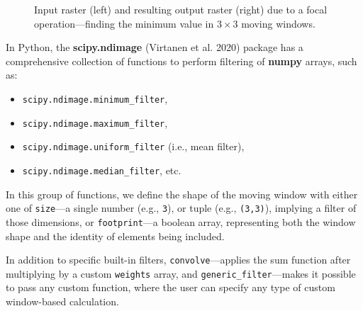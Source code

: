 \documentclass[
  letterpaper,
]{krantz}
\providecommand{\tightlist}{%
  \setlength{\itemsep}{0pt}\setlength{\parskip}{0pt}}\usepackage{longtable,booktabs,array}
\begin{document}
\begin{figure}


\caption{\label{fig-focal-filter}Input raster (left) and resulting
output raster (right) due to a focal operation---finding the minimum
value in \(3 \times 3\) moving windows.}

\end{figure}%

In Python, the \textbf{scipy.ndimage} (Virtanen et al. 2020) package has
a comprehensive collection of functions to perform filtering of
\textbf{numpy} arrays, such as:

\begin{itemize}
\tightlist
\item
  \texttt{scipy.ndimage.minimum\_filter},
\item
  \texttt{scipy.ndimage.maximum\_filter},
\item
  \texttt{scipy.ndimage.uniform\_filter} (i.e., mean filter),
\item
  \texttt{scipy.ndimage.median\_filter}, etc.
\end{itemize}

In this group of functions, we define the shape of the moving window
with either one of \texttt{size}---a single number (e.g., \texttt{3}),
or tuple (e.g., \texttt{(3,3)}), implying a filter of those dimensions,
or \texttt{footprint}---a boolean array, representing both the window
shape and the identity of elements being included.

In addition to specific built-in filters, \texttt{convolve}---applies
the sum function after multiplying by a custom \texttt{weights} array,
and \texttt{generic\_filter}---makes it possible to pass any custom
function, where the user can specify any type of custom window-based
calculation.
\end{document}
